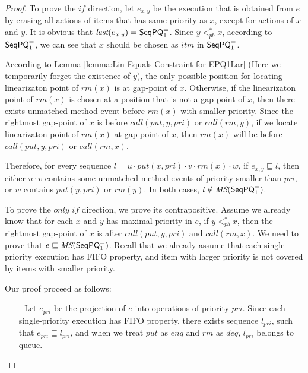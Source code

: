 \begin {proof}

To prove the $\textit{if}$ direction, let $e_{x,y}$ be the execution that is obtained from $e$ by erasing all actions of items that has same priority as $x$, except for actions of $x$ and $y$. It is obvious that $\textit{last}(e_{x,y}) = \mathsf{SeqPQ}_1^{=}$. Since $y <_{\textit{pb}}^* x$, according to $\mathsf{SeqPQ}_1^{=}$, we can see that $x$ should be chosen as $\textit{itm}$ in $\mathsf{SeqPQ}_1^{=}$.

According to Lemma \ref{lemma:Lin Equals Constraint for EPQ1Lar} (Here we temporarily forget the existence of $y$), the only possible position for locating linearizaton point of $\textit{rm}(x)$ is at gap-point of $x$. Otherwise, if the linearizaton point of $\textit{rm}(x)$ is chosen at a position that is not a gap-point of $x$, then there exists unmatched method event before $\textit{rm}(x)$ with smaller priority. Since the rightmost gap-point of $x$ is before $\textit{call}(\textit{put},y,\textit{pri})$ or $\textit{call}(\textit{rm},y)$, if we locate linearizaton point of $\textit{rm}(x)$ at gap-point of $x$, then $\textit{rm}(x)$ will be before $\textit{call}(\textit{put},y,\textit{pri})$ or $\textit{call}(\textit{rm},x)$.

Therefore, for every sequence $l = u \cdot \textit{put}(x,\textit{pri}) \cdot v \cdot \textit{rm}(x) \cdot w$, if $e_{x,y} \sqsubseteq l$, then either $u \cdot v$ contains some unmatched method events of priority smaller than $\textit{pri}$, or $w$ contains $\textit{put}(y,\textit{pri})$ or $\textit{rm}(y)$. In both cases, $l \notin \textit{MS}(\mathsf{SeqPQ}_1^{=})$.

To prove the $\textit{only if}$ direction, we prove its contrapositive. Assume we already know that for each $x$ and $y$ has maximal priority in $e$, if $y <_{\textit{pb}}^* x$, then the rightmost gap-point of $x$ is after $\textit{call}(\textit{put},y,\textit{pri})$ and $\textit{call}(\textit{rm},x)$. We need to prove that $e \sqsubseteq \textit{MS}(\mathsf{SeqPQ}_1^{=})$. Recall that we already assume that each single-priority execution has FIFO property, and item with larger priority is not covered by items with smaller priority.

Our proof proceed as follows:

\begin{itemize}
\setlength{\itemsep}{0.5pt}
\item[-] Let $e_{\textit{pri}}$ be the projection of $e$ into operations of priority $\textit{pri}$. Since each single-priority execution has FIFO property, there exists sequence $l_{\textit{pri}}$, such that $e_{\textit{pri}} \sqsubseteq l_{\textit{pri}}$, and when we treat $\textit{put}$ as $\textit{enq}$ and $\textit{rm}$ as $\textit{deq}$, $l_{\textit{pri}}$ belongs to queue.


\end{itemize}
\end{proof}
